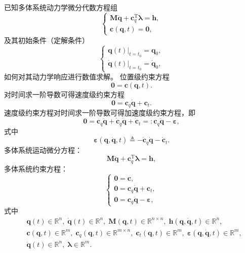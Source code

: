 已知多体系统动力学微分代数方程组
\[
\begin{cases}
        \boldsymbol{M}\ddot{\boldsymbol{q}} + \boldsymbol{c}_q^{\mathrm{T}}\boldsymbol{\lambda} = \boldsymbol{h},\\[4pt]
        \boldsymbol{c}(\boldsymbol{q},t) = \boldsymbol{0},
    \end{cases}
\]
及其初始条件（定解条件）
\[
\begin{cases}
        \boldsymbol{q}(t)\big|_{t=t_0} = \boldsymbol{q}_0,\\[4pt]
        \dot{\boldsymbol{q}}(t)\big|_{t=t_0} = \dot{\boldsymbol{q}}_0,
    \end{cases}
\]
如何对其动力学响应进行数值求解。
位置级约束方程
\[
\boldsymbol{0} = \boldsymbol{c}(\boldsymbol{q},t).
\]
对时间求一阶导数可得速度级约束方程
\[
\boldsymbol{0} = \boldsymbol{c}_q\dot{\boldsymbol{q}} + \boldsymbol{c}_t.
\]
速度级约束方程对时间求一阶导数可得加速度级约束方程，即
\[
\boldsymbol{0} = \boldsymbol{c}_q\ddot{\boldsymbol{q}} + \dot{\boldsymbol{c}}_q\dot{\boldsymbol{q}} + \dot{\boldsymbol{c}}_t =: \boldsymbol{c}_q\ddot{\boldsymbol{q}} - \boldsymbol{\varepsilon},
\]
式中
\[
\boldsymbol{\varepsilon}(\boldsymbol{q},\dot{\boldsymbol{q}},t) \triangleq -\dot{\boldsymbol{c}}_q\dot{\boldsymbol{q}} - \dot{\boldsymbol{c}}_t.
\]
多体系统运动微分方程：
\[
\boldsymbol{M}\ddot{\boldsymbol{q}} + \boldsymbol{c}_q^{\mathrm{T}}\boldsymbol{\lambda} = \boldsymbol{h},
\]
多体系统约束方程：
\[
\begin{cases}
        \boldsymbol{0} = \boldsymbol{c},\\[3pt]
        \boldsymbol{0} = \boldsymbol{c}_q\dot{\boldsymbol{q}} + \boldsymbol{c}_t,\\[3pt]
        \boldsymbol{0} = \boldsymbol{c}_q\ddot{\boldsymbol{q}} - \boldsymbol{\varepsilon},
    \end{cases}
\]
式中
\[
\begin{aligned}
&\boldsymbol{q}(t) \in \mathbb{R}^n,\;\dot{\boldsymbol{q}}(t) \in \mathbb{R}^n,\;\boldsymbol{M}(\boldsymbol{q},t) \in \mathbb{R}^{n\times n},\;\boldsymbol{h}(\boldsymbol{q},\dot{\boldsymbol{q}},t) \in \mathbb{R}^n,\\
    &\boldsymbol{c}(\boldsymbol{q},t) \in \mathbb{R}^m,\;\boldsymbol{c}_q(\boldsymbol{q},t) \in \mathbb{R}^{m\times n},\;\boldsymbol{c}_t(\boldsymbol{q},t) \in \mathbb{R}^m,\;\boldsymbol{\varepsilon}(\boldsymbol{q},\dot{\boldsymbol{q}},t) \in \mathbb{R}^m,\\
    &\ddot{\boldsymbol{q}}(t) \in \mathbb{R}^n,\;\boldsymbol{\lambda} \in \mathbb{R}^m.
\end{aligned}
\]

